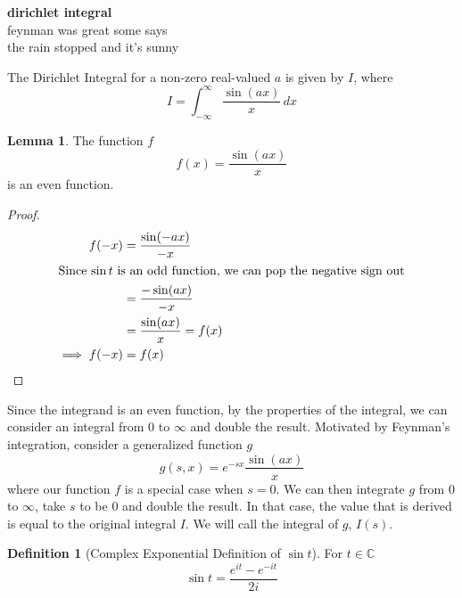 \documentclass[12pt]{article}
\theoremstyle{definition}
\newtheorem*{definition}{Definition}
\newtheorem{lemma}{Lemma}
\begin{document}
\begin{center}
    \large \textbf{dirichlet integral} \\
    {feynman was great some says} \\

    {\small the rain stopped and it's sunny\\}
\end{center}

The Dirichlet Integral for a non-zero real-valued $a$ is given by $I$, where
\begin{equation*}
    I = \int_{-\infty}^{\infty} \frac{\sin(ax)}{x} \,dx
\end{equation*}

\begin{lemma} The function $f$
    \begin{equation*}
        f(x) = \frac{\sin(ax)}{x}
    \end{equation*}
    is an even function.
\end{lemma}
\begin{proof}
    \begin{align*}
        f(-x) &=  \frac{\sin(-ax)}{-x} \\ 
        \intertext{Since $\sin t$ is an odd function, we can pop the negative sign out}
        &= \frac{-\sin(ax)}{-x} \\
        &= \frac{\sin(ax)}{x} = f(x) \\ 
        \implies f(-x) &= f(x)
    \end{align*}
\end{proof}

Since the integrand is an even function, by the properties of the integral, we can consider an integral from $0$ to $\infty$ and double the result. Motivated by Feynman's integration, consider a generalized function $g$ 
\begin{equation*}
    g(s, x) = e^{-sx} \frac{\sin(ax)}{x}
\end{equation*}
where our function $f$ is a special case when $s = 0$. We can then integrate $g$ from $0$ to $\infty$, take $s$ to be 0 and double the result. In that case, the value that is derived is equal to the original integral $I$. We will call the integral of $g$, $I(s)$.

\begin{definition}[Complex Exponential Definition of $\sin t$] For $t \in \mathbb{C}$
    \begin{equation*}
        \sin t = \frac{e^{it} - e^{-it}}{2i}
    \end{equation*}
\end{definition}
\end{document}
